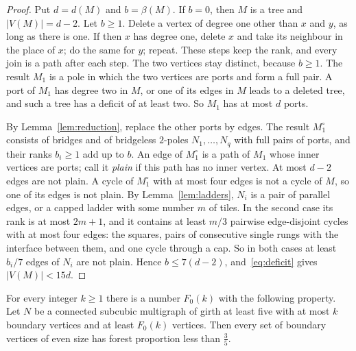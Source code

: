 \begin{proof}
Put $d=d(M)$ and $b=\beta(M)$. If $b=0$, then $M$ is a tree and $|V(M)|=d-2$. Let $b\ge1$. Delete
a vertex of degree one other than $x$ and $y$, as long as there is one. If then $x$ has degree
one, delete $x$ and take its neighbour in the place of $x$; do the same for $y$; repeat. These
steps keep the rank, and every join is a path after each step. The two vertices stay distinct,
because $b\ge1$. The result $M_1$ is a pole in which the two vertices are ports and form a full
pair. A port of $M_1$ has degree two in $M$, or one of its edges in $M$ leads to a deleted tree,
and such a tree has a deficit of at least two. So $M_1$ has at most $d$ ports.

By Lemma~\ref{lem:reduction}, replace the other ports by edges. The result $M_1^{\circ}$
consists of bridges and of bridgeless $2$-poles $N_1,\dots,N_q$ with full pairs of ports, and
their ranks $b_i\ge1$ add up to $b$. An edge of $M_1^{\circ}$ is a path of $M_1$ whose inner
vertices are ports; call it \emph{plain} if this path has no inner vertex. At most $d-2$ edges
are not plain. A cycle of $M_1^{\circ}$ with at most four edges is not a cycle of $M$, so one of
its edges is not plain. By Lemma~\ref{lem:ladders}, $N_i$ is a pair of parallel edges, or a capped
ladder with some number $m$ of tiles. In the second case its rank is at most $2m+1$, and it
contains at least $m/3$ pairwise edge-disjoint cycles with at most four edges: the squares, pairs
of consecutive single rungs with the interface between them, and one cycle through a cap. So in
both cases at least $b_i/7$ edges of $N_i$ are not plain. Hence $b\le7(d-2)$,
and~\eqref{eq:deficit} gives $|V(M)|<15d$.
\end{proof}

\begin{lemma}\label{lem:piecesfive}
For every integer $k\ge1$ there is a number $F_0(k)$ with the following property. Let $N$ be a
connected subcubic multigraph of girth at least five with at most $k$ boundary vertices and at
least $F_0(k)$ vertices. Then every set of boundary vertices of even size has forest proportion
less than $\frac35$.
\end{lemma}

